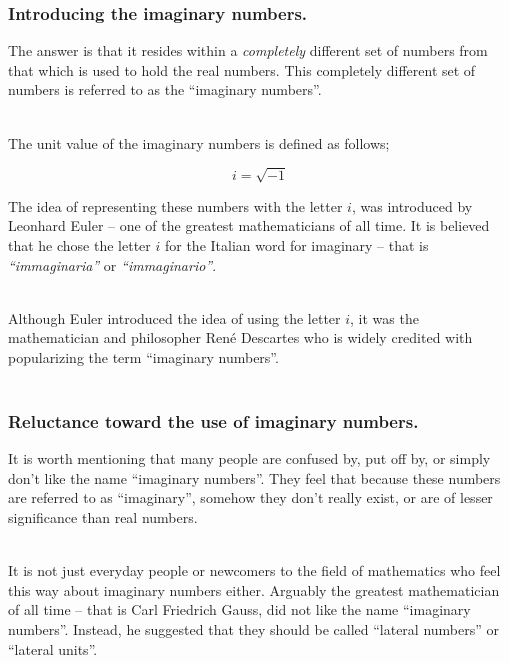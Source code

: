\begin{frame}
\frametitle{Introducing the imaginary numbers.}

The answer is that it resides within a \textit{completely} different set of numbers from that which is used to hold the real numbers. This completely
different set of numbers is referred to as the ``imaginary numbers''.\\~\

The unit value of the imaginary numbers is defined as follows;

\begin{equation}
  i = \sqrt{-1}
\end{equation}

The idea of representing these numbers with the letter \(i\), was introduced by Leonhard Euler -- one of the greatest mathematicians of all time. It is believed
that he chose the letter \(i\) for the Italian word for imaginary -- that is \textit{``immaginaria''} or \textit{``immaginario''}.\\~\

Although Euler introduced the idea of using the letter \(i\), it was the mathematician and philosopher Ren\'e Descartes who is widely credited with popularizing
the term ``imaginary numbers''.\\~\

\end{frame}


%
%

\begin{frame}
\frametitle{Reluctance toward the use of imaginary numbers.}

It is worth mentioning that many people are confused by, put off by, or simply don't like the name ``imaginary numbers''. They feel that because these numbers
are referred to as ``imaginary'', somehow they don't really exist, or are of lesser significance than real numbers.\\~\

It is not just everyday people or newcomers to the field of mathematics who feel this way about imaginary numbers either. Arguably the greatest mathematician
of all time -- that is Carl Friedrich Gauss, did not like the name ``imaginary numbers''. Instead, he suggested that they should be called ``lateral numbers'' or
``lateral units''.\\~\

\end{frame}


%
%

